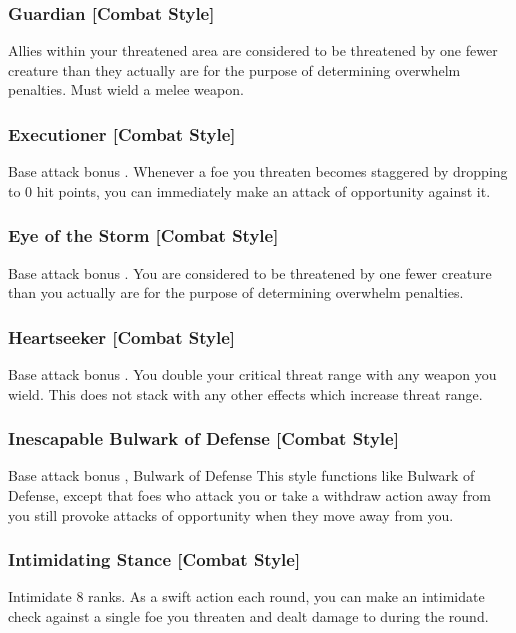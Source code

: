 \subsubsection{Guardian [Combat Style]}
 Allies within your threatened area are considered to be threatened by one fewer creature than they actually are for the purpose of determining overwhelm penalties.
 Must wield a melee weapon.

\subsubsection{Executioner [Combat Style]}
 Base attack bonus .
 Whenever a foe you threaten becomes staggered by dropping to 0 hit points, you can immediately make an attack of opportunity against it.

\subsubsection{Eye of the Storm [Combat Style]}
 Base attack bonus .
 You are considered to be threatened by one fewer creature than you actually are for the purpose of determining overwhelm penalties.

\subsubsection{Heartseeker [Combat Style]}
 Base attack bonus .
 You double your critical threat range with any weapon you wield. This does not stack with any other effects which increase threat range.

\subsubsection{Inescapable Bulwark of Defense [Combat Style]}
\featpre Base attack bonus , Bulwark of Defense
\featben This style functions like Bulwark of Defense, except that foes who attack you or take a withdraw action away from you still provoke attacks of opportunity when they move away from you.

\subsubsection{Intimidating Stance [Combat Style]}
 Intimidate 8 ranks.
 As a swift action each round, you can make an intimidate check against a single foe you threaten and dealt damage to during the round.

